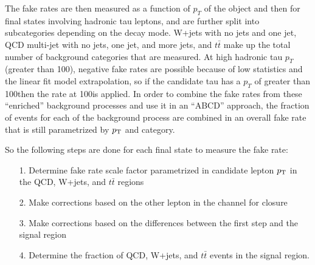 The fake rates are then measured as a function of $p_T$ of the object and then for final states involving hadronic tau leptons, and are further split into subcategories depending on the decay mode.  
W+jets with no jets and one jet, QCD multi-jet with no jets, one jet, and more jets, and $t\bar{t}$ make up the total number of background categories that are measured. 
At high hadronic tau $p_T$ (greater than 100\GeV), negative fake rates are possible because of low statistics and the linear fit model extrapolation, so if the candidate tau has a $p_T$ of greater than 100\GeV then the rate at 100\GeV is applied. 
In order to combine the fake rates from these ``enriched'' background processes and use it in an ``ABCD'' approach, the fraction of events for each of the background process are combined in an overall fake rate that is still parametrized by $p_{\mathrm{T}}$ and category.  






So the following steps are done for each final state to measure the fake rate:
\begin{enumerate}
\item[1.] Determine fake rate scale factor parametrized in candidate lepton $p_{\mathrm{T}}$ in the QCD, W+jets, and $t\bar{t}$ regions
\item[2.] Make corrections based on the other lepton in the channel for closure 
\item[3.] Make corrections based on the differences between the first step and the signal region
\item[4.] Determine the fraction of QCD, W+jets, and $t\bar{t}$ events in the signal region.
\end{enumerate} 

